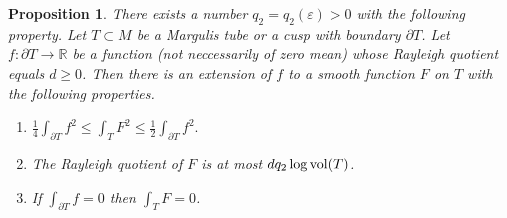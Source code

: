 \documentclass[11pt]{amsart}
\theoremstyle{plain}
\theoremstyle{plain}
\newtheorem{proposition}[theorem]{Proposition}
\theoremstyle{definition}
\renewcommand{\epsilon}{\varepsilon}
\begin{document}
\begin{proposition}\label{tube}
There exists a number $q_2=q_2(\epsilon)>0$ with the following
property. Let $T\subset M$ be a Margulis tube or a cusp 
with boundary $\partial T$.
Let $f:\partial T\to \mathbb{R}$ be a function 
(not neccessarily of zero mean) whose
Rayleigh quotient equals $d\geq 0$. 
Then there is an extension of $f$ to a smooth function $F$ on $T$ with 
the following properties.
\begin{enumerate}
\item $\frac{1}{4}\int_{\partial T}f^2\leq 
\int_TF^2\leq \frac{1}{2}\int_{\partial T}f^2.$
\item The 
Rayleigh quotient of $F$ is at most
$dq_2\log {\rm vol}(T)$. 
\item If $\int_{\partial T}f=0$ then $\int_T F=0$.
\end{enumerate}
\end{proposition}
\end{document}
